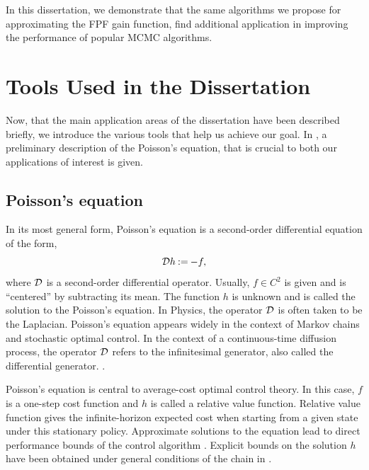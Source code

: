 In this dissertation, we demonstrate that the same algorithms we propose for approximating the FPF gain function, find additional application in improving the performance of popular MCMC algorithms. 

\section{Tools Used in the Dissertation}
\label{s:tools}
Now, that the main application areas of the dissertation have been described briefly, we introduce the various tools that help us achieve our goal. In , a preliminary description of the Poisson's equation, that is crucial to both our applications of interest is given.
\subsection{Poisson's equation} 
\label{s:poissons}
In its most general form, Poisson's equation is a second-order differential equation of the form,
\begin{equation*}
{\cal D} h \mathbin{:=} - f,
\end{equation*}
where ${\cal D}$ is a second-order differential operator. Usually, $f \in C^2$ is given and is ``centered'' by subtracting its mean. The function $h$ is unknown and is called the solution to the Poisson's equation. In Physics, the operator ${\cal D}$ is often taken to be the Laplacian. Poisson's equation appears widely in the context of Markov chains and stochastic optimal control. In the context of a continuous-time diffusion process, the operator ${\cal D}$ refers to the infinitesimal generator, also called the differential generator.  .

Poisson's equation is central to average-cost optimal control theory. In this case, $f$ is a one-step cost function and $h$ is called a relative value function.  Relative value function gives the infinite-horizon expected cost when starting from a given state under this stationary policy. Approximate solutions to the equation lead to direct performance bounds of the control algorithm \cite{ctcn}. Explicit bounds on the solution $h$ have been obtained under general conditions of the chain in \cite{}.

